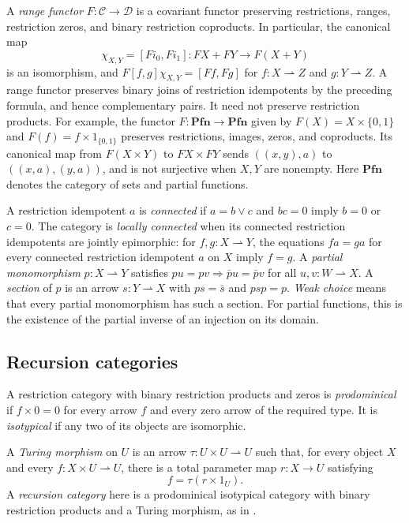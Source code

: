 \documentclass[11pt]{article}
\newcommand{\Pfn}{\mathbf{Pfn}}
\begin{document}
A \emph{range functor} $F:\mathcal C\to\mathcal D$ is a covariant
functor preserving restrictions, ranges, restriction zeros, and binary
restriction coproducts. In particular, the canonical map
\[
 \chi_{X,Y}=[F i_0,F i_1]:FX+FY\longrightarrow F(X+Y)
\]
is an isomorphism, and
$F[f,g]\chi_{X,Y}=[Ff,Fg]$ for $f:X\rightharpoonup Z$ and
$g:Y\rightharpoonup Z$. A range functor preserves binary
joins of restriction idempotents by the preceding formula, and hence
complementary pairs.
It need not preserve restriction products. For example, the functor
$F:\Pfn\to\Pfn$ given by $F(X)=X\times\{0,1\}$ and
$F(f)=f\times1_{\{0,1\}}$ preserves restrictions, images, zeros,
and coproducts. Its canonical map from $F(X\times Y)$ to
$FX\times FY$ sends $((x,y),a)$ to $((x,a),(y,a))$, and is
not surjective when $X,Y$ are nonempty. Here $\Pfn$ denotes the
category of sets and partial functions.

A restriction idempotent $a$ is \emph{connected} if $a=b\vee c$ and $bc=0$
imply $b=0$ or $c=0$. The category is \emph{locally connected}
when its connected restriction idempotents are jointly epimorphic: for
$f,g:X\rightharpoonup Y$, the equations $fa=ga$ for every connected
restriction idempotent $a$ on $X$ imply $f=g$.
A \emph{partial monomorphism} $p:X\rightharpoonup Y$ satisfies
$pu=pv\Rightarrow\bar p u=\bar p v$ for all
$u,v:W\rightharpoonup X$.
A \emph{section} of $p$ is an arrow $s:Y\rightharpoonup X$
with $ps=\bar s$ and $psp=p$.
\emph{Weak choice} means that every partial monomorphism has such
a section. For partial functions, this is the existence of the
partial inverse of an injection on its domain.

\subsection{Recursion categories}

A restriction category with binary restriction products and zeros is
\emph{prodominical} if $f\times0=0$ for every arrow $f$ and every
zero arrow of the required type. It is \emph{isotypical} if any
two of its objects are isomorphic.

A \emph{Turing morphism} on $U$ is an arrow
$\tau:U\times U\rightharpoonup U$ such that, for every object $X$
and every $f:X\times U\rightharpoonup U$, there is a total
parameter map $r:X\to U$ satisfying
\[
 f=\tau(r\times1_U).
\]
A \emph{recursion category} here is a prodominical isotypical
category with binary restriction products and a Turing morphism,
as in \cite[Section 9]{Heller}.
\end{document}
